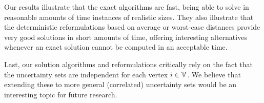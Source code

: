 \documentclass[12pt]{article}
\newcommand{\blue}[1]{{\color{black}#1}}
\begin{document}
Our results illustrate that the exact algorithms are fast, being able to solve in reasonable amounts of time instances of realistic sizes. They also illustrate that the deterministic reformulations based on average or worst-case distances provide very good solutions in short amounts of time, offering interesting alternatives whenever an exact solution cannot be computed in an acceptable time. 

\blue{Last, our solution algorithms and reformulations critically rely on the fact that the uncertainty sets are independent for each vertex $i\in \mathbb{V}$. We believe that extending these to more general (correlated) uncertainty sets would be an interesting topic for future research.}


\end{document}
